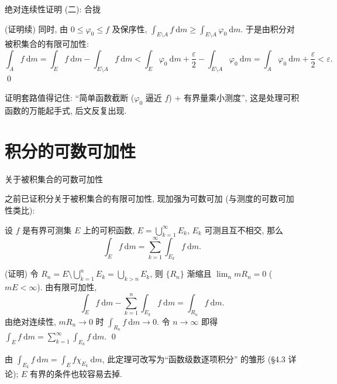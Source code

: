 
\begin{frame}{绝对连续性证明 (二): 合拢}

\startproof[bg=yellow, fg=red](证明续)
同时, 由 $0 \leqslant \varphi_0 \leqslant f$ 及保序性,
$\int_{E \setminus A} f ~ \mathrm{d} m \geqslant \int_{E \setminus A} \varphi_0 ~ \mathrm{d} m$.
于是由积分对被积集合的\alert{有限可加性}:
\[
\int_A f ~ \mathrm{d} m
= \int_E f ~ \mathrm{d} m - \int_{E \setminus A} f ~ \mathrm{d} m
< \int_E \varphi_0 ~ \mathrm{d} m + \frac{\varepsilon}{2} - \int_{E \setminus A} \varphi_0 ~ \mathrm{d} m
= \int_A \varphi_0 ~ \mathrm{d} m + \frac{\varepsilon}{2}
< \varepsilon .
\]
\qed

\pause

\begin{attnblock}
证明套路值得记住: ``\alert{简单函数截断} ($\varphi_0$ 逼近 $f$) $+$ \alert{有界量乘小测度}'', 这是处理可积函数的万能起手式, 后文反复出现.
\end{attnblock}

\end{frame}


\section[可数可加]{积分的可数可加性}


\begin{frame}{关于被积集合的可数可加性}

之前已证积分关于被积集合的\alert{有限}可加性, 现加强为可数可加 (与测度的可数可加性类比):

\begin{thm}[可数可加性]
设 $f$ 是有界可测集 $E$ 上的可积函数, $E = \bigcup_{k=1}^{\infty} E_k$, $E_k$ 可测且互不相交, 那么
\[
\int_E f ~ \mathrm{d} m = \sum_{k=1}^{\infty} \int_{E_k} f ~ \mathrm{d} m .
\]
\end{thm}

\startproof[bg=yellow, fg=red](证明)
令 $R_n = E \setminus \bigcup_{k=1}^{n} E_k = \bigcup_{k > n} E_k$, 则 $\{R_n\}$ 渐缩且
$\lim_n m R_n = 0$ ($mE < \infty$). 由有限可加性,
\[
\int_E f ~ \mathrm{d} m - \sum_{k=1}^{n} \int_{E_k} f ~ \mathrm{d} m
= \int_{R_n} f ~ \mathrm{d} m .
\]
由\alert{绝对连续性}, $m R_n \to 0$ 时 $\int_{R_n} f ~ \mathrm{d} m \to 0$. 令 $n \to \infty$ 即得
$\int_E f ~ \mathrm{d} m = \sum_{k=1}^{\infty} \int_{E_k} f ~ \mathrm{d} m$. \qed

\pause

\begin{remark}
由 $\int_{E_k} f ~ \mathrm{d} m = \int_E f \chi_{E_k} ~ \mathrm{d} m$, 此定理可改写为``函数级数逐项积分''
的雏形 (\S 4.3 详论); $E$ 有界的条件也较容易去掉.
\end{remark}

\end{frame}

